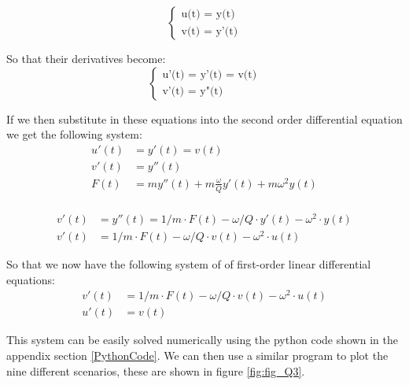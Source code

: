 \begin{equation*}
    \left\{ \begin{matrix} \mbox{u(t) = y(t)}\\
    \mbox{v(t) = y'(t)} \end{matrix} \right.
\end{equation*}

So that their derivatives become:\\

\begin{equation*}
    \left\{ \begin{matrix} \mbox{u'(t) = y'(t) = v(t)}\\
    \mbox{v'(t) = y"(t)} \end{matrix} \right.
\end{equation*}

If we then substitute in these equations into the second order differential equation we get the following system:\\

\begin{align*}
    u'(t) &= y'(t) = v(t)\\
    v'(t) &= y''(t)\\
    F(t) &= m y''(t)+m\frac{\omega}{Q}y'(t)+m \omega^2 y(t)\\
\end{align*}

\begin{align*}
    v'(t) &= y''(t) = 1/m \cdot F(t) - \omega/Q\cdot y'(t)-\omega^2\cdot y(t)\\
    v'(t) &= 1/m\cdot F(t) - \omega/Q\cdot v(t)-\omega^2\cdot u(t)
\end{align*}

So that we now have the following system of of first-order linear differential equations:\\

\begin{align}
    v'(t) &= 1/m\cdot F(t)-\omega/Q\cdot v(t)- \omega^2\cdot u(t)\\
    u'(t) &= v(t)
\end{align}

This system can be easily solved numerically using the python code shown in the appendix section \ref{PythonCode}. We can then use a similar program to plot the nine different scenarios, these are shown in figure \ref{fig:fig_Q3}.\\


